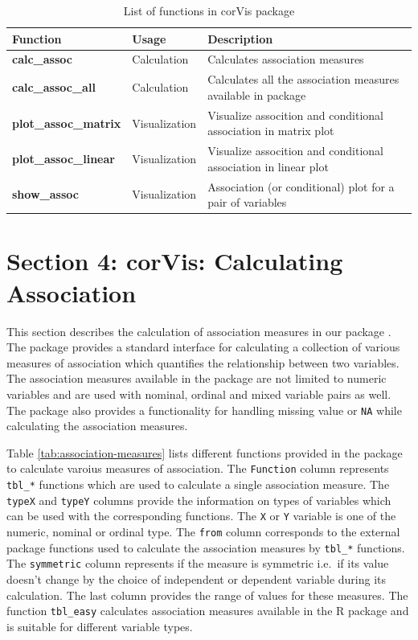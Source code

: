 \begin{Schunk}
\begin{table}

\caption{\label{tab:function-corVis}List of functions in corVis package}
\centering
\begin{tabular}[t]{>{}lll}
\toprule
Function & Usage & Description\\
\midrule
\textbf{calc\_assoc} & Calculation & Calculates association measures\\
\textbf{calc\_assoc\_all} & Calculation & Calculates all the association measures available in package\\
\textbf{plot\_assoc\_matrix} & Visualization & Visualize assocition and conditional association in matrix plot\\
\textbf{plot\_assoc\_linear} & Visualization & Visualize assocition and conditional association in linear plot\\
\textbf{show\_assoc} & Visualization & Association (or conditional) plot for a pair of variables\\
\bottomrule
\end{tabular}
\end{table}

\end{Schunk}

\hypertarget{section-4-corvis-calculating-association}{%
\section{Section 4: corVis: Calculating
Association}\label{section-4-corvis-calculating-association}}

This section describes the calculation of association measures in our
package . The package provides a standard interface for
calculating a collection of various measures of association which
quantifies the relationship between two variables. The association
measures available in the package are not limited to numeric variables
and are used with nominal, ordinal and mixed variable pairs as well. The
package also provides a functionality for handling missing value or
\texttt{NA} while calculating the association measures.

Table \ref{tab:association-measures} lists different functions provided
in the package to calculate varoius measures of association. The
\texttt{Function} column represents \texttt{tbl\_*} functions which are
used to calculate a single association measure. The \texttt{typeX} and
\texttt{typeY} columns provide the information on types of variables
which can be used with the corresponding functions. The \texttt{X} or
\texttt{Y} variable is one of the numeric, nominal or ordinal type. The
\texttt{from} column corresponds to the external package functions used
to calculate the association measures by \texttt{tbl\_*} functions. The
\texttt{symmetric} column represents if the measure is symmetric i.e.~if
its value doesn't change by the choice of independent or dependent
variable during its calculation. The last column provides the range of
values for these measures. The function \texttt{tbl\_easy} calculates
association measures available in the R package 
and is suitable for different variable types.

